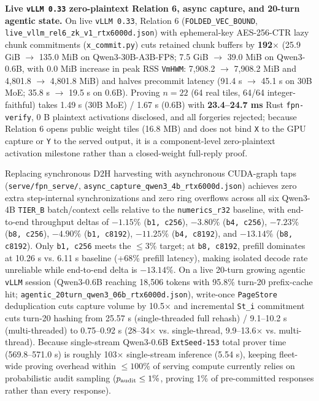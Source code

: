 \documentclass[10pt]{article}
\begin{document}
\textbf{Live \texttt{vLLM 0.\allowbreak{}33} zero-plaintext Relation 6, async capture, and 20-turn agentic state.} On live \texttt{vLLM 0.\allowbreak{}33}, Relation 6 (\texttt{FOLDED\_\allowbreak{}VEC\_\allowbreak{}BOUND}, \texttt{live\_\allowbreak{}vllm\_\allowbreak{}rel6\_\allowbreak{}zk\_\allowbreak{}v1\_\allowbreak{}rtx6000d.\allowbreak{}json}) with ephemeral-key AES-256-CTR lazy chunk commitments (\texttt{x\_\allowbreak{}commit.\allowbreak{}py}) cuts retained chunk buffers by \textbf{192$\times$} (25.9 GiB $\to$ 135.0 MiB on Qwen3-30B-A3B-FP8; 7.5 GiB $\to$ 39.0 MiB on Qwen3-0.6B, with 0.0 MiB increase in peak RSS \texttt{VmHWM}: 7,908.2 $\to$ 7,908.2 MiB and 4,801.8 $\to$ 4,801.8 MiB) and halves precommit latency (91.4 s $\to$ 45.1 s on 30B MoE; 35.8 s $\to$ 19.5 s on 0.6B). Proving $n=22$ (64 real tiles, 64/64 integer-faithful) takes 1.49 s (30B MoE) / 1.67 s (0.6B) with \textbf{23.4--24.7 ms} Rust \texttt{fpn-verify}, 0 B plaintext activations disclosed, and all forgeries rejected; because Relation 6 opens public weight tiles (16.8 MB) and does not bind \texttt{X} to the GPU capture or \texttt{Y} to the served output, it is a component-level zero-plaintext activation milestone rather than a closed-weight full-reply proof.

Replacing synchronous D2H harvesting with asynchronous CUDA-graph taps (\texttt{serve/fpn\_\allowbreak{}serve/}, \texttt{async\_\allowbreak{}capture\_\allowbreak{}qwen3\_\allowbreak{}4b\_\allowbreak{}rtx6000d.\allowbreak{}json}) achieves zero extra step-internal synchronizations and zero ring overflows across all six Qwen3-4B \texttt{TIER\_\allowbreak{}B} batch/context cells relative to the \texttt{numerics\_\allowbreak{}r32} baseline, with end-to-end throughput deltas of \textbf{$-1.15\%$} (\texttt{b1, c256}), \textbf{$-3.80\%$} (\texttt{b4, c256}), \textbf{$-7.23\%$} (\texttt{b8, c256}), \textbf{$-4.90\%$} (\texttt{b1, c8192}), \textbf{$-11.25\%$} (\texttt{b4, c8192}), and \textbf{$-13.14\%$} (\texttt{b8, c8192}). Only \texttt{b1, c256} meets the $\le 3\%$ target; at \texttt{b8, c8192}, prefill dominates at 10.26 s vs. 6.11 s baseline (+68\% prefill latency), making isolated decode rate unreliable while end-to-end delta is $-13.14\%$. On a live 20-turn growing agentic \texttt{vLLM} session (Qwen3-0.6B reaching 18,506 tokens with 95.8\% turn-20 prefix-cache hit; \texttt{agentic\_\allowbreak{}20turn\_\allowbreak{}qwen3\_\allowbreak{}06b\_\allowbreak{}rtx6000d.\allowbreak{}json}), write-once \texttt{PageStore} deduplication cuts capture volume by 10.5$\times$ and incremental \texttt{St\_\allowbreak{}i} commitment cuts turn-20 hashing from 25.57 s (single-threaded full rehash) / 9.1--10.2 s (multi-threaded) to 0.75--0.92 s (28--34$\times$ vs. single-thread, 9.9--13.6$\times$ vs. multi-thread). Because single-stream Qwen3-0.6B \texttt{ExtSeed-153} total prover time (569.8--571.0 s) is roughly 103$\times$ single-stream inference (5.54 s), keeping fleet-wide proving overhead within $\le 100\%$ of serving compute currently relies on probabilistic audit sampling ($p_{\rm audit} \le 1\%$, proving 1\% of pre-committed responses rather than every response).
\end{document}
